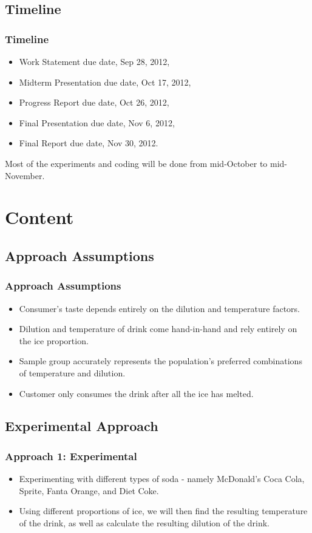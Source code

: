 \documentclass[compress,handout,10pt]{beamer}
\let\olditem\item
\renewcommand{\item}{\setlength{\itemsep}{0.5\baselineskip}\olditem}
\begin{document}
\subsection{Timeline}
\begin{frame}
    \frametitle{Timeline}
\begin{itemize}
    \item Work Statement due date, Sep 28, 2012,
    \item Midterm Presentation due date, Oct 17, 2012,
    \item Progress Report due date, Oct 26, 2012,
    \item Final Presentation due date, Nov 6, 2012,
    \item Final Report due date, Nov 30, 2012.
\end{itemize}
\vspace{6pt} Most of the experiments and coding will be done from mid-October to mid-November.
\end{frame}

\section{Content}
\subsection{Approach Assumptions}
\begin{frame}
    \frametitle{Approach Assumptions}

\begin {itemize}
\item Consumer's taste depends entirely on the dilution and temperature factors.
\item Dilution and temperature of drink come hand-in-hand and rely entirely on the ice proportion.
\item Sample group accurately represents the population's preferred combinations of temperature and dilution.
\item Customer only consumes the drink after all the ice has melted.
\end{itemize}
\end{frame}

\subsection{Experimental Approach}
\begin{frame}
    \frametitle{Approach 1: Experimental}

\begin {itemize}
\item Experimenting with different types of soda - namely  McDonald's Coca Cola, Sprite, Fanta Orange, and Diet Coke.
\item Using different proportions of ice, we will then find the resulting temperature of the drink, as well as calculate the resulting dilution of the drink. 

\end{itemize}

\end{frame}
\end{document}
